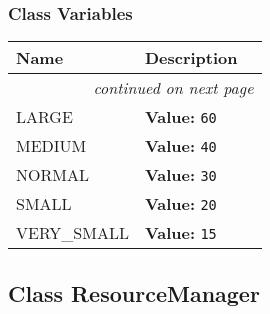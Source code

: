     \label{pygame-asteroids:font:Font}


  \subsubsection{Class Variables}

    \vspace{-1cm}
\hspace{\varindent}\begin{longtable}{|p{\varnamewidth}|p{\vardescrwidth}|l}
\cline{1-2}
\cline{1-2} \centering \textbf{Name} & \centering \textbf{Description}& \\
\cline{1-2}
\endhead\cline{1-2}\multicolumn{3}{r}{\small\textit{continued on next page}}\\\endfoot\cline{1-2}
\endlastfoot\raggedright L\-A\-R\-G\-E\- & \raggedright \textbf{Value:} 
{\tt 60}&\\
\cline{1-2}
\raggedright M\-E\-D\-I\-U\-M\- & \raggedright \textbf{Value:} 
{\tt 40}&\\
\cline{1-2}
\raggedright N\-O\-R\-M\-A\-L\- & \raggedright \textbf{Value:} 
{\tt 30}&\\
\cline{1-2}
\raggedright S\-M\-A\-L\-L\- & \raggedright \textbf{Value:} 
{\tt 20}&\\
\cline{1-2}
\raggedright V\-E\-R\-Y\-\_\-S\-M\-A\-L\-L\- & \raggedright \textbf{Value:} 
{\tt 15}&\\
\cline{1-2}
\end{longtable}



\subsection{Class ResourceManager}

